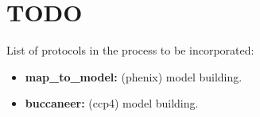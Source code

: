 \section{TODO}

List of protocols in the process to be incorporated:

\begin{itemize}
 \item \textbf{map\_to\_model:} (phenix)  model building.
 \item \textbf{buccaneer:} (ccp4)  model building.
\end{itemize}
